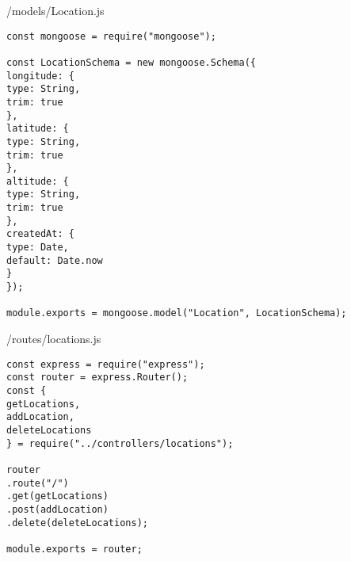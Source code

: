 /models/Location.js
\begin{verbatim}
const mongoose = require("mongoose");

const LocationSchema = new mongoose.Schema({
longitude: {
type: String,
trim: true
},
latitude: {
type: String,
trim: true
},
altitude: {
type: String,
trim: true
},
createdAt: {
type: Date,
default: Date.now
}
});

module.exports = mongoose.model("Location", LocationSchema);
\end{verbatim}
/routes/locations.js
\begin{verbatim}
const express = require("express");
const router = express.Router();
const {
getLocations,
addLocation,
deleteLocations
} = require("../controllers/locations");

router
.route("/")
.get(getLocations)
.post(addLocation)
.delete(deleteLocations);

module.exports = router;
\end{verbatim}
